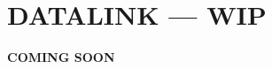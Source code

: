 \section{DATALINK --- WIP}

\begin{center}
    \vspace{4em}%
    \Large\titlefont%
    \textbf{COMING SOON}%
\end{center}